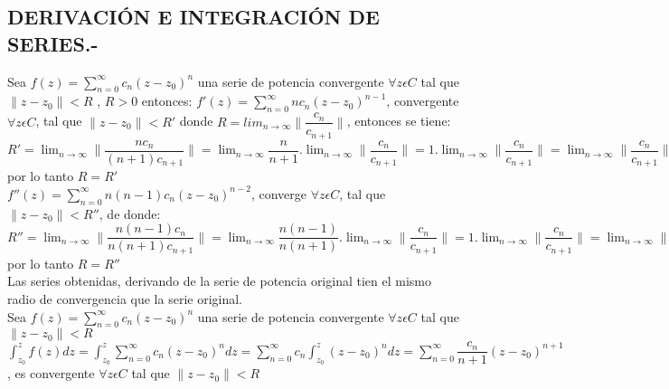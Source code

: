 \documentclass[10pt,a4paper]{article}
\begin{document}
\subsection{DERIVACIÓN E INTEGRACIÓN DE SERIES.-}
Sea $\displaystyle{f(z) = \sum_{n = 0}^{\infty} c_n (z-z_0)^n}$ una serie de potencia convergente $\forall z \epsilon C$ tal que $\displaystyle{\parallel z - z_0 \parallel < R}$ , $R > 0$ entonces:
$\displaystyle{f'(z) = \sum_{n = 0}^{\infty} n c_n (z-z_0)^{n-1}}$, convergente $\displaystyle{\forall z \epsilon C}$, tal que $\displaystyle{\parallel z - z_0 \parallel < R'}$ donde $\displaystyle{R = lim_{n \to \infty} \parallel \dfrac{c_n}{c_{n+1}} \parallel}$, entonces se tiene: \\
$\displaystyle{R' = \lim_{n \to \infty} \parallel \dfrac{n c_n}{(n+1) c_{n+1}} \parallel =\lim_{n \to \infty}  \dfrac{n}{n+1}  . \lim_{n \to \infty} \parallel \dfrac{c_n}{c_{n+1}} \parallel = 1  . \lim_{n \to \infty} \parallel \dfrac{c_n}{c_{n+1}} \parallel = \lim_{n \to \infty} \parallel \dfrac{c_n}{c_{n+1}} \parallel  = R}$ \\
por lo tanto $R = R'$\\
$\displaystyle{f''(z) = \sum_{n = 0}^{\infty} n (n-1) c_n (z-z_0)^{n-2}}$, converge $\forall z \epsilon C$, tal que $\displaystyle{\parallel z - z_0 \parallel < R''}$, de donde: \\
$\displaystyle{R'' = \lim_{n \to \infty} \parallel \dfrac{n (n-1) c_n}{n(n+1) c_{n+1}} \parallel =\lim_{n \to \infty}  \dfrac{n(n-1)}{n(n+1)}  . \lim_{n \to \infty} \parallel \dfrac{c_n}{c_{n+1}} \parallel = 1  . \lim_{n \to \infty} \parallel \dfrac{c_n}{c_{n+1}} \parallel = \lim_{n \to \infty} \parallel \dfrac{c_n}{c_{n+1}} \parallel  = R}$ \\ 
por lo tanto $R = R''$ \\
Las series obtenidas, derivando de la serie de potencia original tien el mismo radio de convergencia que la serie original. \\
Sea $\displaystyle{f(z) = \sum_{n = 0}^{\infty} c_n (z-z_0)^n}$ una serie de potencia convergente $\forall z \epsilon C$ tal que $\parallel z - z_0 \parallel < R$ \\
$\displaystyle{\int_{z_0}^{z} f(z) dz = \int_{z_0}^{z} \sum_{n = 0}^{\infty} c_n (z-z_0)^n dz = \sum_{n = 0}^{\infty} c_n \int_{z_0}^{z}  (z-z_0)^n dz =  \sum_{n = 0}^{\infty} \dfrac{c_n}{n+1} (z-z_0)^{n+1}}$, es convergente $\forall z \epsilon C$ tal que $\parallel z - z_0 \parallel < R$
\end{document}
